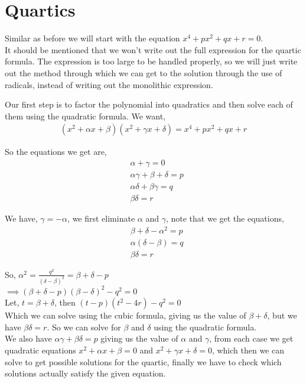 \documentclass[a4paper,12pt,abstracton]{scrartcl}
\theoremstyle{dotlessP}
\theoremstyle{dotlessS}
\theoremstyle{remark}
\theoremstyle{definition}
\begin{document}
\eject

\section{Quartics}

Similar as before we will start with the equation $x^4+px^2+qx+r=0$.\\

It should be mentioned that we won't write out the full expression for the quartic formula. The expression is too large to be handled properly, so we will just write out the method through which we can get to the solution through the use of radicals, instead of writing out the monolithic expression.

Our first step is to factor the polynomial into quadratics and then solve each of them using the quadratic formula. We want,
\begin{align*}
(x^2+\alpha x+\beta)(x^2+\gamma x+\delta)=x^4+px^2+qx+r
\end{align*}

So the equations we get are,
\begin{align*}
&\alpha+\gamma=0\\
&\alpha\gamma+\beta+\delta=p\\
&\alpha\delta+\beta\gamma=q\\
&\beta\delta=r
\end{align*}

We have, $\gamma=-\alpha$, we first eliminate $\alpha$ and $\gamma$, note that we get the equations,
\begin{align*}
&\beta+\delta-\alpha^2=p\\
&\alpha(\delta-\beta)=q\\
&\beta\delta=r
\end{align*}

So, $\alpha^2=\frac{q^2}{(\delta-\beta)^2}=\beta+\delta-p$\\

$\implies(\beta+\delta-p)(\beta-\delta)^2-q^2=0$\\

Let, $t=\beta+\delta$, then
$(t-p)(t^2-4r)-q^2=0$\\
Which we can solve using the cubic formula, giving us the value of $\beta+\delta$, but we have $\beta\delta=r$. So we can solve for $\beta$ and $\delta$ using the quadratic formula.\\
We also have $\alpha\gamma+\beta\delta=p$ giving us the value of $\alpha$ and $\gamma$, from each case we get quadratic equations $x^2+\alpha x+\beta=0$ and $x^2+\gamma x+\delta=0$, which then we can solve to get possible solutions for the quartic, finally we have to check which solutions actually satisfy the given equation.\\
\end{document}
